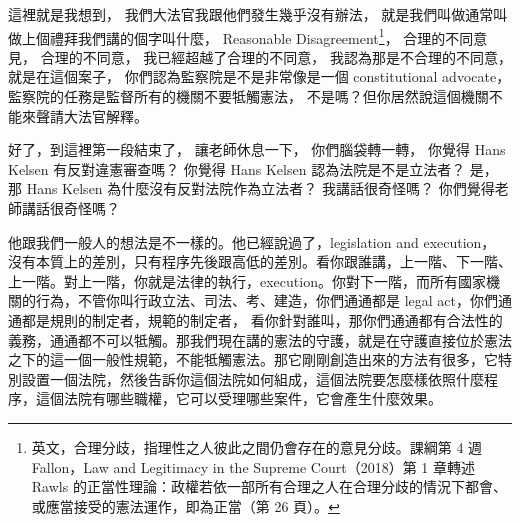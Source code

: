\hypertarget{w05:cue:174}{}這裡就是我想到，
\hypertarget{w05:cue:175}{}我們大法官我跟他們發生幾乎沒有辦法，
\hypertarget{w05:cue:176}{}就是我們叫做通常叫做上個禮拜我們講的個字叫什麼，
\hypertarget{w05:cue:177}{}Reasonable Disagreement\footnote{英文，合理分歧，指理性之人彼此之間仍會存在的意見分歧。課綱第 4 週 Fallon，Law and Legitimacy in the Supreme Court（2018）第 1 章轉述 Rawls 的正當性理論：政權若依一部所有合理之人在合理分歧的情況下都會、或應當接受的憲法運作，即為正當（第 26 頁）。}，
\hypertarget{w05:cue:178}{}合理的不同意見，
\hypertarget{w05:cue:179}{}合理的不同意，
\hypertarget{w05:cue:180}{}我已經超越了合理的不同意，
\hypertarget{w05:cue:181}{}我認為那是不合理的不同意，
\hypertarget{w05:cue:182}{}就是在這個案子，
\hypertarget{w05:cue:183}{}你們認為監察院是不是非常像是一個 constitutional advocate，
\hypertarget{w05:cue:184}{}監察院的任務是監督所有的機關不要牴觸憲法，
\hypertarget{w05:cue:185}{}不是嗎？但你居然說這個機關不能來聲請大法官解釋。

\hypertarget{w05:cue:186}{}好了，到這裡第一段結束了，
\hypertarget{w05:cue:187}{}讓老師休息一下，
\hypertarget{w05:cue:188}{}你們腦袋轉一轉，
\hypertarget{w05:cue:189}{}你覺得 Hans Kelsen 有反對違憲審查嗎？
\hypertarget{w05:cue:190}{}你覺得 Hans Kelsen 認為法院是不是立法者？
\hypertarget{w05:cue:191}{}是，
\hypertarget{w05:cue:192}{}那 Hans Kelsen 為什麼沒有反對法院作為立法者？
\hypertarget{w05:cue:193}{}我講話很奇怪嗎？
\hypertarget{w05:cue:194}{}你們覺得老師講話很奇怪嗎？

\hypertarget{w05:cue:195}{}他跟我們一般人的想法是不一樣的。他已經說過了，legislation and execution，
\hypertarget{w05:cue:196}{}沒有本質上的差別，只有程序先後跟高低的差別。看你跟誰講，上一階、下一階、上一階。對上一階，你就是法律的執行，execution。你對下一階，而所有國家機關的行為，不管你叫行政立法、司法、考、建造，你們通通都是 legal act，你們通通都是規則的制定者，規範的制定者，
\hypertarget{w05:cue:197}{}看你針對誰叫，那你們通通都有合法性的義務，通通都不可以牴觸。那我們現在講的憲法的守護，就是在守護直接位於憲法之下的這一個一般性規範，不能牴觸憲法。那它剛剛創造出來的方法有很多，它特別設置一個法院，然後告訴你這個法院如何組成，這個法院要怎麼樣依照什麼程序，這個法院有哪些職權，它可以受理哪些案件，它會產生什麼效果。

